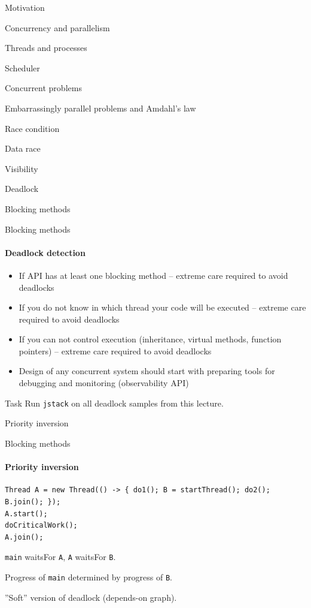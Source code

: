 \begin{section}{Motivation}
\begin{section}{Concurrency and parallelism}
\begin{section}{Threads and processes}
\begin{section}{Scheduler}
\begin{section}{Concurrent problems}
\begin{subsection}{Embarrassingly parallel problems and Amdahl's law}
\begin{subsection}{Race condition}
\begin{subsection}{Data race}
\begin{subsection}{Visibility}
\begin{subsection}{Deadlock}
\begin{frame}[fragile]{Blocking methods}
\end{frame}


\begin{frame}{Blocking methods}
\framesubtitle{Deadlock detection}

\begin{itemize}
    \item If API has at least one blocking method -- extreme care required to avoid deadlocks
    \item If you do not know in which thread your code will be executed -- extreme care required to avoid deadlocks
    \item If you can not control execution (inheritance, virtual methods, function pointers) -- extreme care required to avoid deadlocks
    \item Design of any concurrent system should start with preparing tools for debugging and monitoring (observability API)
\end{itemize}

\pause

\begin{homeworkmail}{Task \taskJstack}{
    Run \texttt{jstack} on all deadlock samples from this lecture.
}
\end{homeworkmail}

\end{frame}


\begin{subsection}{Priority inversion}
\showTOCSub


\begin{frame}[fragile]{Blocking methods}
\framesubtitle{Priority inversion}

\begin{verbatim}
Thread A = new Thread(() -> { do1(); B = startThread(); do2(); B.join(); }); 
A.start();
doCriticalWork();
A.join();
\end{verbatim}

\texttt{main} waitsFor \texttt{A}, \texttt{A} waitsFor \texttt{B}.

Progress of \texttt{main} determined by progress of \texttt{B}.

''Soft'' version of deadlock (depends-on graph). 


\end{frame}
\end{subsection}
\end{subsection}
\end{subsection}
\end{subsection}
\end{subsection}
\end{subsection}
\end{section}
\end{section}
\end{section}
\end{section}
\end{section}
